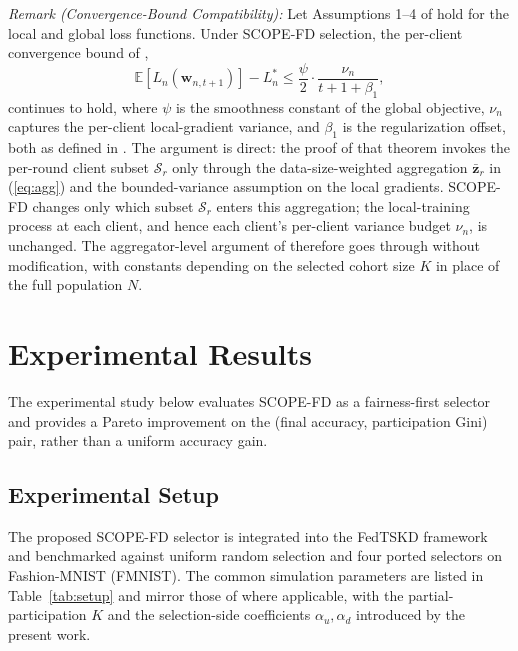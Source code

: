 \documentclass[journal]{IEEEtran}
\begin{document}
\textit{Remark (Convergence-Bound Compatibility):} Let Assumptions 1--4 of \cite{mu2024fedtskd} hold for the local and global loss functions. Under SCOPE-FD selection, the per-client convergence bound of \cite[Theorem~1]{mu2024fedtskd},
\begin{equation}
\mathbb{E}\!\left[L_n\!\left(\bm{w}_{n,t+1}\right)\right] - L_n^{*} \le \frac{\psi}{2}\cdot\frac{\nu_n}{t+1+\beta_1},
\label{eq:conv_bound}
\end{equation}
continues to hold, where $\psi$ is the smoothness constant of the global objective, $\nu_n$ captures the per-client local-gradient variance, and $\beta_1$ is the regularization offset, both as defined in \cite[Theorem~1]{mu2024fedtskd}. The argument is direct: the proof of that theorem invokes the per-round client subset $\mathcal{S}_r$ only through the data-size-weighted aggregation $\bar{\bm{z}}_r$ in (\ref{eq:agg}) and the bounded-variance assumption on the local gradients. SCOPE-FD changes only which subset $\mathcal{S}_r$ enters this aggregation; the local-training process at each client, and hence each client's per-client variance budget $\nu_n$, is unchanged. The aggregator-level argument of \cite{mu2024fedtskd} therefore goes through without modification, with constants depending on the selected cohort size $K$ in place of the full population $N$.


\section{Experimental Results}
\label{sec:experiments}

The experimental study below evaluates SCOPE-FD as a fairness-first selector and provides a Pareto improvement on the (final accuracy, participation Gini) pair, rather than a uniform accuracy gain.

\subsection{Experimental Setup}
\label{ssec:exp-setup}

The proposed SCOPE-FD selector is integrated into the FedTSKD framework \cite{mu2024fedtskd} and benchmarked against uniform random selection and four ported selectors on Fashion-MNIST (FMNIST). The common simulation parameters are listed in Table~\ref{tab:setup} and mirror those of \cite{mu2024fedtskd} where applicable, with the partial-participation $K$ and the selection-side coefficients $\alpha_u, \alpha_d$ introduced by the present work.
\end{document}
